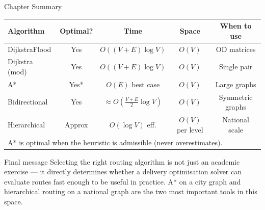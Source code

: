 \documentclass[aspectratio=169,10pt]{beamer}
\begin{document}
\begin{frame}[allowframebreaks]{Chapter Summary}
  \begin{center}
    \begin{tabular}{lcccc}
      \toprule
      \textbf{Algorithm} & \textbf{Optimal?} &
      \textbf{Time} & \textbf{Space} &
      \textbf{When to use} \\
      \midrule
      DijkstraFlood  & Yes  & $O((V+E)\log V)$ & $O(V)$ & OD matrices \\
      Dijkstra (mod) & Yes  & $O((V+E)\log V)$ & $O(V)$ & Single pair \\
      A*             & Yes* & $O(E)$ best case & $O(V)$ & Large graphs \\
      Bidirectional  & Yes  & $\approx O\!\left(\frac{V+E}{2}\log V\right)$
                     & $O(V)$ & Symmetric graphs \\
      Hierarchical   & Approx & $O(\log V)$ eff. & $O(V)$ per level &
                     National scale \\
      \bottomrule
      \multicolumn{5}{l}{\scriptsize * A* is optimal when the heuristic
        is admissible (never overestimates).}
    \end{tabular}
  \end{center}

  \begin{alertblock}{Final message}
    Selecting the right routing algorithm is not just an academic exercise
    --- it directly determines whether a delivery optimisation solver can
    evaluate routes fast enough to be useful in practice.  A* on a city
    graph and hierarchical routing on a national graph are the two most
    important tools in this space.
  \end{alertblock}
\end{frame}
\end{document}
